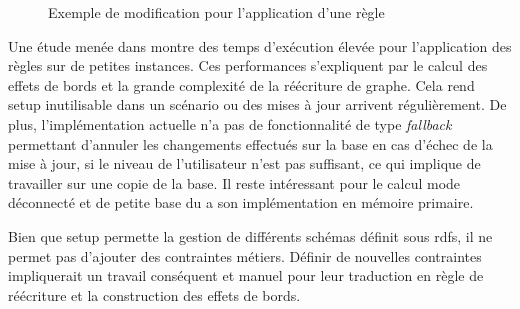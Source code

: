 \begin{figure}[htb]
    \centering
    \caption{Exemple de modification pour l'application d'une règle}
    \label{fig:app_rule}
\end{figure}

Une étude menée dans \cite{chabinGraphRewritingSystem2020,chabinGraphRewritingRules2021} montre des temps d'exécution élevée pour l'application des règles sur de petites instances.
Ces performances s'expliquent par le calcul des effets de bords et la grande complexité de la réécriture de graphe.
Cela rend \gls{setup} inutilisable dans un scénario ou des mises à jour arrivent régulièrement.
De plus, l'implémentation actuelle n'a pas de fonctionnalité de type \textit{fallback} permettant d'annuler les changements effectués sur la base en cas d'échec de la mise à jour, si le niveau de l'utilisateur n'est pas suffisant, ce qui implique de travailler sur une copie de la base.
Il reste intéressant pour le calcul mode déconnecté et de petite base du a son implémentation en mémoire primaire.

Bien que \gls{setup} permette la gestion de différents schémas définit sous \gls{rdfs}, il ne permet pas d'ajouter des contraintes métiers.
Définir de nouvelles contraintes impliquerait un travail conséquent et manuel pour leur traduction en règle de réécriture et la construction des effets de bords.
